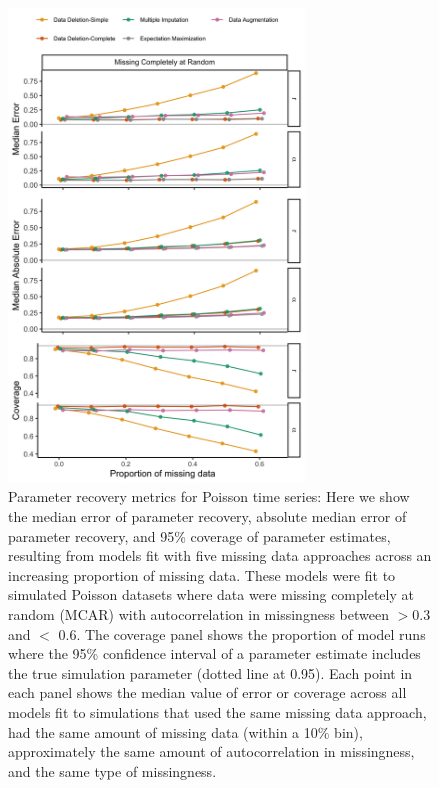 \documentclass{article}
\begin{document}
\begin{figure}
    \centering
    \noindent\includegraphics[width = 0.7\textwidth]{Figures/MockedUpFigures/parameterRecoveryPoisson_MCARlong.png}
    \caption{Parameter recovery metrics for Poisson time series: Here we show the median error of parameter recovery, absolute median error of parameter recovery, and 95\% coverage of parameter estimates, resulting from models fit with five missing data approaches across an increasing proportion of missing data. These models were fit to simulated Poisson datasets where data were missing completely at random (MCAR) with autocorrelation in missingness between $>$0.3 and $<$ 0.6. The coverage panel shows the proportion of model runs where the 95\% confidence interval of a parameter estimate includes the true simulation parameter (dotted line at 0.95). Each point in each panel shows the median value of error or coverage across all models fit to simulations that used the same missing data approach, had the same amount of missing data (within a 10\% bin), approximately the same amount of autocorrelation in missingness, and the same type of missingness.}

    \label{fig:ParamRec_Pois}
\end{figure}
\end{document}
